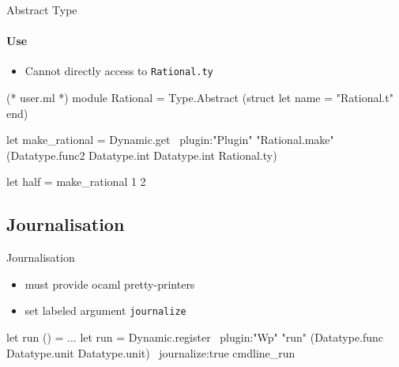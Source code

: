 \begin{frame}[fragile]{Abstract Type}
\framesubtitle{Use}

\begin{itemize}
\item Cannot directly access to \lstinline+Rational.ty+
\end{itemize}

\begin{ocamlcode}
(* user.ml *)
module Rational = 
  Type.Abstract
    (struct let name = "Rational.t" end)

let make_rational =
  Dynamic.get
    ~plugin:"Plugin" "Rational.make"
    (Datatype.func2
       Datatype.int Datatype.int Rational.ty)

let half = make_rational 1 2
\end{ocamlcode}
\end{frame}


\subsection{Journalisation}

\begin{frame}[fragile]{Journalisation}

\begin{itemize}
\item must provide ocaml pretty-printers
\item set labeled argument \lstinline+journalize+
\end{itemize}

\begin{ocamlcode}
let run () = ...
let run = 
  Dynamic.register ~plugin:"Wp" "run"
    (Datatype.func Datatype.unit Datatype.unit)
    ~journalize:true
    cmdline_run
\end{ocamlcode}
\end{frame}
